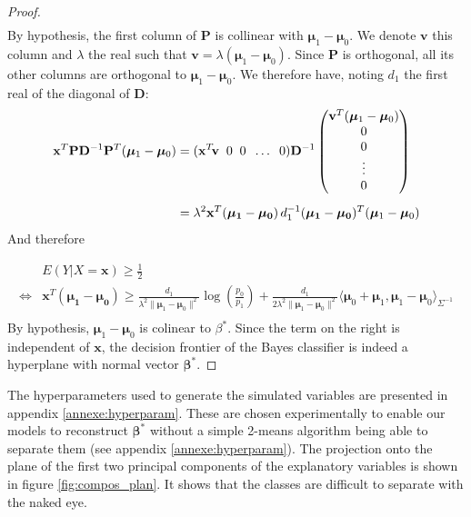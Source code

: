 \documentclass[preprint,12pt]{elsarticle}
\begin{document}
\begin{proof}
\begin{align}
\end{align}
By hypothesis, the first column of $\mathbf{P}$ is collinear with $\bm{\mu}_1 - \bm{\mu}_0$. We denote $\mathbf{v}$ this column and $\lambda$ the real such that $\mathbf{v} = \lambda (\bm{\mu}_1 - \bm{\mu}_0)$. Since $\mathbf{P}$ is orthogonal, all its other columns are orthogonal to $\bm{\mu}_1 - \bm{\mu}_0$. We therefore have, noting $d_1$ the first real of the diagonal of $\mathbf{D}$:
\begin{align}
    \mathbf{x}^T\mathbf{P}\mathbf{D}^{-1}\mathbf{P}^T(\bm{\mu}_1 - \bm{\mu}_0) &= (\mathbf{x}^T \hspace{-2 pt}\mathbf{v} \; \; 0 \; \; 0 \; \;\hdots \; \; 0) \mathbf{D}^{-1} \begin{pmatrix}
        \mathbf{v}^T(\bm{\mu}_1 - \bm{\mu}_0) \\
        0 \\
        0 \\
        \vdots \\
        0
        \end{pmatrix}\\[5 pt]
    &= \lambda^2\mathbf{x}^T (\mathbf{\bm{\mu}_1 - \bm{\mu}_0}) \, d_1^{-1} (\mathbf{\bm{\mu}_1 - \bm{\mu}_0})^T(\bm{\mu}_1 - \bm{\mu}_0)
\end{align}
And therefore

\begin{align}
    & E(Y|X = \mathbf{x}) \geq \frac{1}{2}\\[5 pt]
    \iff & \mathbf{x}^T (\mathbf{\bm{\mu}_1 - \bm{\mu}_0})  \geq \frac{d_1}{ \lambda^2\lVert\bm{\mu}_1 - \bm{\mu}_0 \rVert^2}\log\left(\frac{p_0}{p_1} \right) + \frac{d_1}{2 \lambda^2\lVert\bm{\mu}_1 - \bm{\mu}_0 \rVert^2}\langle \bm{\mu}_0 + \bm{\mu}_1 , \bm{\mu}_1 - \bm{\mu}_0\rangle_{\Sigma^{-1}}  \\[5 pt]
\end{align}
By hypothesis, $\bm{\mu}_1 - \bm{\mu}_0$ is colinear to $\beta^*$. Since the term on the right is independent of $\mathbf{x}$, the decision frontier of the Bayes classifier is indeed a hyperplane with normal vector $\bm{\beta}^*$.
\end{proof}

The hyperparameters used to generate the simulated variables are presented in appendix \ref{annexe:hyperparam}. These are chosen experimentally to enable our models to reconstruct $\bm{\beta}^*$ without a simple 2-means algorithm being able to separate them (see appendix \ref{annexe:hyperparam}). The projection onto the plane of the first two principal components of the explanatory variables is shown in figure \ref{fig:compos_plan}. It shows that the classes are difficult to separate with the naked eye.
\end{document}
